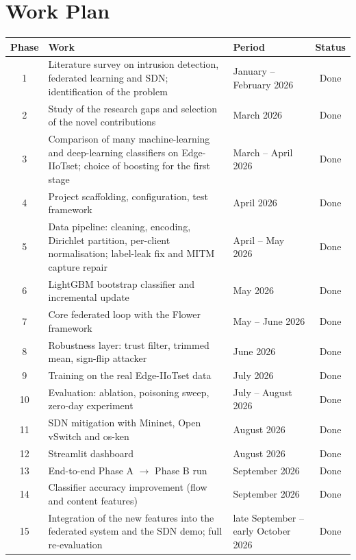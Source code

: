\section{Work Plan}
{\renewcommand{\arraystretch}{1.25}
\begin{longtable}{|c|p{6.9cm}|>{\raggedright\arraybackslash}p{3cm}|c|}
\hline
\textbf{Phase} & \textbf{Work} & \textbf{Period} & \textbf{Status} \\ \hline
\endhead
1 & Literature survey on intrusion detection, federated learning and SDN; identification of the problem & January -- February 2026 & Done \\ \hline
2 & Study of the research gaps and selection of the novel contributions & March 2026 & Done \\ \hline
3 & Comparison of many machine-learning and deep-learning classifiers on Edge-IIoTset; choice of boosting for the first stage & March -- April 2026 & Done \\ \hline
4 & Project scaffolding, configuration, test framework & April 2026 & Done \\ \hline
5 & Data pipeline: cleaning, encoding, Dirichlet partition, per-client normalisation; label-leak fix and MITM capture repair & April -- May 2026 & Done \\ \hline
6 & LightGBM bootstrap classifier and incremental update & May 2026 & Done \\ \hline
7 & Core federated loop with the Flower framework & May -- June 2026 & Done \\ \hline
8 & Robustness layer: trust filter, trimmed mean, sign-flip attacker & June 2026 & Done \\ \hline
9 & Training on the real Edge-IIoTset data & July 2026 & Done \\ \hline
10 & Evaluation: ablation, poisoning sweep, zero-day experiment & July -- August 2026 & Done \\ \hline
11 & SDN mitigation with Mininet, Open vSwitch and os-ken & August 2026 & Done \\ \hline
12 & Streamlit dashboard & August 2026 & Done \\ \hline
13 & End-to-end Phase A $\rightarrow$ Phase B run & September 2026 & Done \\ \hline
14 & Classifier accuracy improvement (flow and content features) & September 2026 & Done \\ \hline
15 & Integration of the new features into the federated system and the SDN demo; full re-evaluation & late September -- early October 2026 & Done \\ \hline

\end{longtable}}
